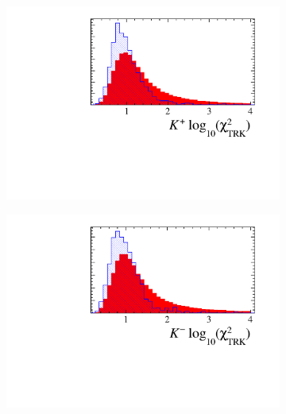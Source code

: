 \begin{figure}[!h]
\begin{subfigure}[t]{0.22\textwidth}
   \end{subfigure}
   \begin{subfigure}[t]{0.22\textwidth}
      \centering
      \includegraphics[width=1.0\textwidth]{figs/Selection/Phi_BDT_Var_Ds2KKPi_Phi_K0_TRACK_CHI2NDOF.pdf}
   \end{subfigure}
   \begin{subfigure}[t]{0.22\textwidth}
      \centering
      \includegraphics[width=1.0\textwidth]{figs/Selection/Phi_BDT_Var_Ds2KKPi_Phi_K1_TRACK_CHI2NDOF.pdf}
   \end{subfigure}
   \begin{subfigure}[t]{0.22\textwidth}
      \centering

\end{subfigure}
\end{figure}
